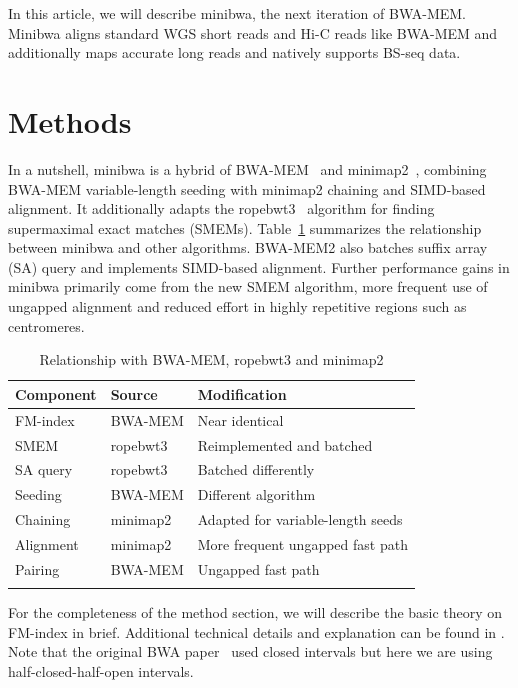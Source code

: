 \documentclass[webpdf,contemporary,large,namedate]{oup-authoring-template}%
\begin{document}
In this article, we will describe minibwa, the next iteration of BWA-MEM.
Minibwa aligns standard WGS short reads and Hi-C reads like BWA-MEM
and additionally maps accurate long reads and natively supports BS-seq data.

\section{Methods}

In a nutshell, minibwa is a hybrid of BWA-MEM~\citep{Li:2013aa} and minimap2~\citep{Li:2018ab},
combining BWA-MEM variable-length seeding with minimap2 chaining and SIMD-based alignment.
It additionally adapts the ropebwt3~\citep{Li:2024ac} algorithm for finding supermaximal exact matches (SMEMs).
Table~\ref{tab:relation} summarizes the relationship between minibwa and other algorithms.
BWA-MEM2 also batches suffix array (SA) query and implements SIMD-based alignment.
Further performance gains in minibwa primarily come from the new SMEM algorithm,
more frequent use of ungapped alignment and reduced effort in highly repetitive regions such as centromeres.

\begin{table}[b]
\caption{Relationship with BWA-MEM, ropebwt3 and minimap2\label{tab:relation}}
\begin{tabular*}{\columnwidth}{@{\extracolsep\fill}lll@{\extracolsep\fill}}
\toprule
Component & Source & Modification \\
\midrule
FM-index  & BWA-MEM  & Near identical \\
SMEM      & ropebwt3 & Reimplemented and batched \\
SA query  & ropebwt3 & Batched differently \\
Seeding   & BWA-MEM  & Different algorithm \\
Chaining  & minimap2 & Adapted for variable-length seeds \\
Alignment & minimap2 & More frequent ungapped fast path \\
Pairing   & BWA-MEM  & Ungapped fast path \\
\botrule
\end{tabular*}
\end{table}

For the completeness of the method section, we will describe the basic theory on FM-index in brief.
Additional technical details and explanation can be found in \citet{Li:2024ac}.
Note that the original BWA paper~\citep{Li:2009uq} used closed intervals but here we are using half-closed-half-open intervals.
\end{document}
